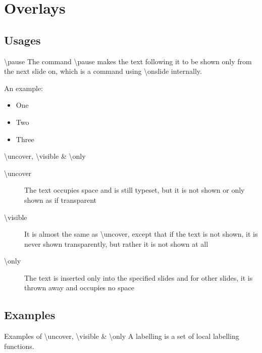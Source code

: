 \section{Overlays}

\subsection{Usages}

\begin{frame}{\textbackslash pause}
	The command \textbackslash pause makes the text following it to be shown only from the next slide on, which is a command using \textbackslash onslide internally.

	An example:
	\begin{itemize}
		\pause
		\item One
		\pause
		\item Two
		\pause
		\item Three
	\end{itemize}
\end{frame}

\begin{frame}{\textbackslash uncover, \textbackslash visible \& \textbackslash only}
	\begin{description}
		\item[\textbackslash uncover] The text occupies space and is still typeset, but it is not shown or only shown as if transparent
		\item[\textbackslash visible] It is almost the same as \textbackslash uncover, except that if the text is not shown, it is never shown transparently, but rather it is not shown at all
		\item[\textbackslash only] The text is inserted only into the specified slides and for other slides, it is thrown away and occupies no space
	\end{description}
\end{frame}

\subsection{Examples}

\begin{frame}{Examples of \textbackslash uncover, \textbackslash visible \& \textbackslash only}
	A labelling is a set of local labelling functions.

	\begin{itemize}
	\end{itemize}

	\begin{figure}[ht]
		\centering
		
	\end{figure}
\end{frame}

